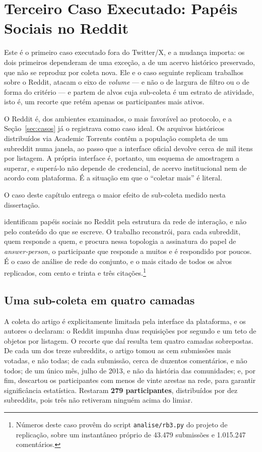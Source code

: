 \chapter{Terceiro Caso Executado: Papéis Sociais no Reddit}
\label{cap:caso-papeis}

Este é o primeiro caso executado fora do Twitter/X, e a mudança importa: os dois
primeiros dependeram de uma exceção, a de um acervo histórico preservado, que não se
reproduz por coleta nova. Ele e o caso seguinte replicam trabalhos sobre o Reddit,
atacam o eixo de \emph{volume} --- e não o de largura de filtro ou o de forma do
critério --- e partem de alvos cuja sub-coleta é um estrato de atividade, isto é, um
recorte que retém apenas os participantes mais ativos.

O Reddit é, dos ambientes examinados, o mais favorável ao protocolo, e a
Seção~\ref{sec:casos} já o registrava como caso ideal. Os arquivos históricos
distribuídos via Academic Torrents contêm a população completa de um subreddit numa
janela, ao passo que a interface oficial devolve cerca de mil itens por listagem. A
própria interface é, portanto, um esquema de amostragem a superar, e superá-lo não
depende de credencial, de acervo institucional nem de acordo com plataforma. É a
situação em que o ``coletar mais'' é literal.

O caso deste capítulo entrega o maior efeito de sub-coleta medido nesta dissertação.

 identificam papéis sociais no Reddit pela estrutura
da rede de interação, e não pelo conteúdo do que se escreve. O trabalho reconstrói,
para cada subreddit, quem responde a quem, e procura nessa topologia a assinatura do
papel de \emph{answer-person}, o participante que responde a muitos e é respondido por
poucos. É o caso de análise de rede do conjunto, e o mais citado de todos os alvos
replicados, com cento e trinta e três citações.\footnote{Números deste caso provêm do
script \texttt{analise/rb3.py} do projeto de replicação, sobre um instantâneo próprio de
43.479 submissões e 1.015.247 comentários.}

\section{Uma sub-coleta em quatro camadas}

A coleta do artigo é explicitamente limitada pela interface da plataforma, e os autores
o declaram: o Reddit impunha duas requisições por segundo e um teto de objetos por
listagem. O recorte que daí resulta tem quatro camadas sobrepostas. De cada um dos treze
subreddits, o artigo tomou as cem submissões mais votadas, e não todas; de cada
submissão, cerca de duzentos comentários, e não todos; de um único mês, julho de
2013, e não da história das comunidades; e, por fim, descartou os participantes com
menos de vinte arestas na rede, para garantir significância estatística. Restaram \textbf{279
participantes}, distribuídos por dez subreddits, pois três não retiveram ninguém acima
do limiar.

